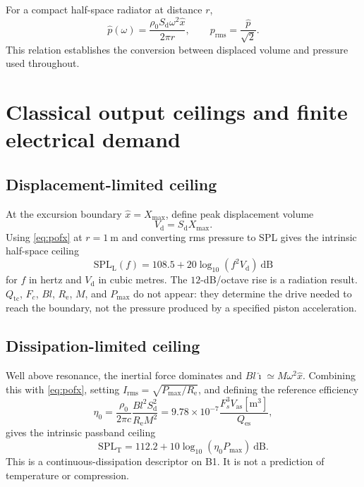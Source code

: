 \documentclass[11pt,a4paper]{article}
\numberwithin{equation}{section}
\newcommand{\Sd}{S_{\mathrm{d}}}
\newcommand{\Xmax}{X_{\mathrm{max}}}
\newcommand{\Vd}{V_{\mathrm{d}}}
\newcommand{\Mms}{M}
\renewcommand{\Re}{R_{\mathrm{e}}}
\newcommand{\Bl}{Bl}
\newcommand{\Qes}{Q_{\mathrm{es}}}
\newcommand{\Qtc}{Q_{\mathrm{tc}}}
\newcommand{\Vas}{V_{\mathrm{as}}}
\newcommand{\Pmax}{P_{\mathrm{max}}}
\begin{document}
For a compact half-space radiator at distance $r$,
\begin{equation}
	\hat p(\omega)=
	\frac{\rho_0\Sd\omega^2\hat x}{2\pi r},
	\qquad
	p_{\mathrm{rms}}=\frac{\hat p}{\sqrt2}.
	\label{eq:pofx}
\end{equation}
This relation establishes the conversion between displaced volume and
pressure used throughout.

\section{Classical output ceilings and finite electrical demand}
\label{sec:freq}

\subsection{Displacement-limited ceiling}
\label{sec:freq-displacement}

At the excursion boundary $\hat x=\Xmax$, define peak displacement volume
\begin{equation}
	\Vd=\Sd\Xmax.
	\label{eq:vd}
\end{equation}
Using \cref{eq:pofx} at $r=\SI{1}{\meter}$ and converting rms pressure to
SPL gives the intrinsic half-space ceiling
\begin{equation}
	\boxed{
	\mathrm{SPL}_{\mathrm L}(f)
	=108.5+20\log_{10}\!\left(f^2\Vd\right)\ \mathrm{dB}}
	\label{eq:SPLL}
\end{equation}
for $f$ in hertz and $\Vd$ in cubic metres.  The $12$-dB/octave rise is a
radiation result.  $\Qtc$, $F_c$, $\Bl$, $\Re$, $\Mms$, and $\Pmax$ do not
appear: they determine the drive needed to reach the boundary, not the
pressure produced by a specified piston acceleration.

\subsection{Dissipation-limited ceiling}
\label{sec:freq-thermal}

Well above resonance, the inertial force dominates and
$\Bl\hat\imath\simeq\Mms\omega^2\hat x$.  Combining this with
\cref{eq:pofx}, setting
$I_{\mathrm{rms}}=\sqrt{\Pmax/\Re}$, and defining the reference efficiency
\begin{equation}
	\eta_0=
	\frac{\rho_0}{2\pi c}
	\frac{\Bl^2\Sd^2}{\Re\Mms^2}
	=9.78\times10^{-7}
	\frac{F_s^3\Vas[\mathrm{m^3}]}{\Qes},
	\label{eq:eta0}
\end{equation}
gives the intrinsic passband ceiling
\begin{equation}
	\boxed{
	\mathrm{SPL}_{\mathrm T}
	=112.2+10\log_{10}(\eta_0\Pmax)\ \mathrm{dB}}.
	\label{eq:SPLT}
\end{equation}
This is a continuous-dissipation descriptor on B1.  It is not a prediction
of temperature or compression.
\end{document}
